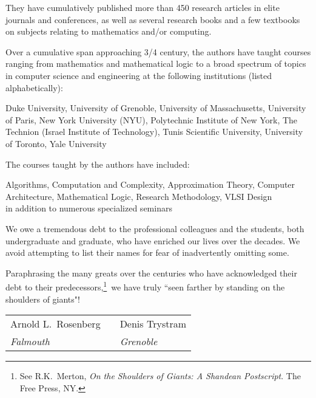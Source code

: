 \medskip

\noindent
They have cumulatively published more than 450 research articles in elite journals and conferences, as well as several research books and a few textbooks on subjects relating to
mathematics and/or computing.

\bigskip

Over a cumulative span approaching 3/4 century, the authors have taught courses ranging from mathematics and mathematical logic to a broad spectrum of topics in computer science and engineering at the following institutions (listed alphabetically):

\smallskip

\noindent
Duke University, 
University of Grenoble,
University of Massachusetts,
University of Paris,
New York University (NYU),
Polytechnic Institute of New York,
The Technion (Israel Institute of Technology),
Tunis Scientific University,
University of Toronto,
Yale University

\medskip

\noindent
The courses taught by the authors have included:

\smallskip

\noindent
Algorithms,
Computation and Complexity, Approximation Theory,
Computer Architecture,
Mathematical Logic,
Research Methodology,
VLSI Design \\
in addition to numerous specialized seminars

\bigskip
\bigskip

\noindent
We owe a tremendous debt to the professional colleagues and the students, both undergraduate and graduate, who have enriched our lives over the decades.  We avoid attempting to list their names for fear of inadvertently omitting some.

\smallskip

Paraphrasing the many greats over the centuries who have acknowledged their debt to their predecessors,\footnote{See R.K.~Merton,  {\it On the Shoulders of Giants: A Shandean Postscript}.  The Free Press, NY.}~we have truly ``seen farther by standing on the shoulders of giants"!

\bigskip

\hfill \begin{tabular}{lll}
Arnold L.~Rosenberg & \hspace*{.1in} & Denis Trystram \\
{\em Falmouth} & \hspace*{.1in} & {\em Grenoble}
\end{tabular}
